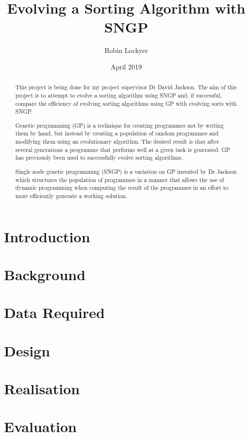 \documentclass{article}
\title{Evolving a Sorting Algorithm with SNGP}
\author{Robin Lockyer}
\date{April 2019}
\affil{University of Liverpool}
\begin{document}
	
	\maketitle	
	
	\begin{abstract}
		This project is being done for my project supervisor Dr David Jackson. The aim of this project is to attempt to evolve a sorting algorithm using SNGP and, if successful, compare the efficiency of evolving sorting algorithms using GP with evolving sorts with SNGP.
		
		Genetic programming (GP) is a technique for creating programmes not by writing them by hand, but instead by creating a population of random programmes and modifying them using an evolutionary algorithm. The desired result is that after several generations a programme that performs well at a given task is generated. GP has previously been used to successfully evolve sorting algorithms.
		
		Single node genetic programming (SNGP) is a variation on GP invented by Dr Jackson which structures the population of programmes in a manner that allows the use of dynamic programming when computing the result of the programmes in an effort to more efficiently generate a working solution.
	\end{abstract}

	\tableofcontents
	
	\section{Introduction}
	
	\section{Background}
	
	\section{Data Required}
	
	\section{Design}
	
	\section{Realisation}
	
	\section{Evaluation}
	
\end{document}
